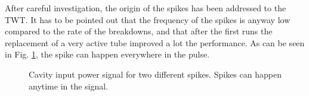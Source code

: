  After careful investigation, the origin of the spikes has been addressed to the TWT. It has to be pointed out that the frequency of the spikes is anyway low compared to the rate of the breakdowns, and that after the first runs the replacement of a very active tube improved a lot the performance. As can be seen in Fig. \ref{spikesAndDetuning}, the spike can happen everywhere in the pulse.

 \begin{figure}[h]
 \centering
 \hspace{2mm}
 \caption{Cavity input power signal for two different spikes. Spikes can happen anytime in the signal.}
 \label{spikesAndDetuning}
 \end{figure}

